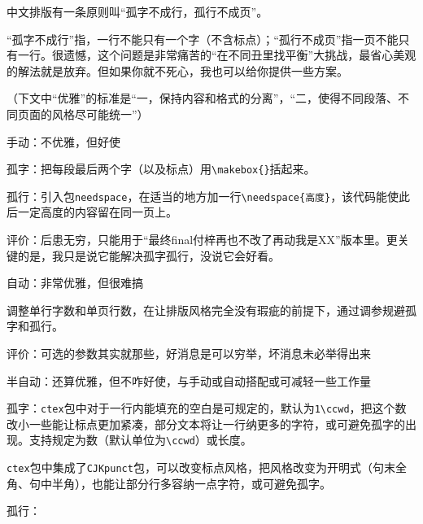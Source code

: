 \documentclass[10pt,openany]{book}
\begin{document}
中文排版有一条原则叫“孤字不成行，孤行不成页”。

“孤字不成行”指，一行不能只有一个字（不含标点）；“孤行不成页”指一页不能只有一行。很遗憾，这个问题是非常痛苦的“在不同丑里找平衡”大挑战，最省心美观的解法就是放弃。但如果你就不死心，我也可以给你提供一些方案。

（下文中“优雅”的标准是“一，保持内容和格式的分离”，“二，使得不同段落、不同页面的风格尽可能统一”）

\begin{tightitem}
    \item   手动：不优雅，但好使
\end{tightitem}

孤字：把每段最后两个字（以及标点）用\texttt{\textbackslash{}makebox\{\}}括起来。

孤行：引入包\texttt{needspace}，在适当的地方加一行\texttt{\textbackslash{}needspace\{高度\}}，该代码能使此后一定高度的内容留在同一页上。

评价：后患无穷，只能用于“最终final付梓再也不改了再动我是XX”版本里。更关键的是，我只是说它能解决孤字孤行，没说它会好看。

\begin{tightitem}
    \item   自动：非常优雅，但很难搞
\end{tightitem}

调整单行字数和单页行数，在让排版风格完全没有瑕疵的前提下，通过调参规避孤字和孤行。

评价：可选的参数其实就那些，好消息是可以穷举，坏消息未必举得出来

\begin{tightitem}
    \item   半自动：还算优雅，但不咋好使，与手动或自动搭配或可减轻一些工作量
\end{tightitem}

孤字：\texttt{ctex}包中对于一行内能填充的空白是可规定的，默认为\texttt{1\textbackslash{}ccwd}，把这个数改小一些能让标点更加紧凑，部分文本将让一行纳更多的字符，或可避免孤字的出现。支持规定为数（默认单位为\texttt{\textbackslash{}ccwd}）或长度。



\texttt{ctex}包中集成了\texttt{CJKpunct}包，可以改变标点风格，把风格改变为开明式（句末全角、句中半角），也能让部分行多容纳一点字符，或可避免孤字。



孤行：
\end{document}
